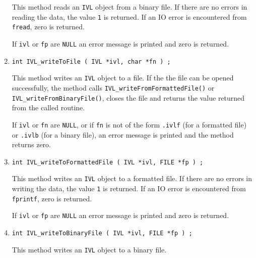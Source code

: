 \begin{enumerate}
\par
This method reads an {\tt IVL} object from a binary file.
If there are no errors in reading the data, 
the value {\tt 1} is returned.
If an IO error is encountered from {\tt fread}, zero is returned.
\par {}
If {\tt ivl} or {\tt fp} are {\tt NULL} an error message 
is printed and zero is returned.
\item
\begin{verbatim}
int IVL_writeToFile ( IVL *ivl, char *fn ) ;
\end{verbatim}
\par
This method writes an {\tt IVL} object to a file.
If the the file can be opened successfully, 
the method calls {\tt IVL\_writeFromFormattedFile()} or
{\tt IVL\_writeFromBinaryFile()}, 
closes the file
and returns the value returned from the called routine.
\par {}
If {\tt ivl} or {\tt fn} are {\tt NULL}, 
or if {\tt fn} is not of the form
{\tt *.ivlf} (for a formatted file) 
or {\tt *.ivlb} (for a binary file),
an error message is printed and the method returns zero.
\item
\begin{verbatim}
int IVL_writeToFormattedFile ( IVL *ivl, FILE *fp ) ;
\end{verbatim}
\par
This method writes an {\tt IVL} object to a formatted file.
If there are no errors in writing the data, 
the value {\tt 1} is returned.
If an IO error is encountered from {\tt fprintf}, zero is returned.
\par {}
If {\tt ivl} or {\tt fp} are {\tt NULL} an error message is printed and
zero is returned.
\item
\begin{verbatim}
int IVL_writeToBinaryFile ( IVL *ivl, FILE *fp ) ;
\end{verbatim}
\par
This method writes an {\tt IVL} object to a binary file.

\end{enumerate}
